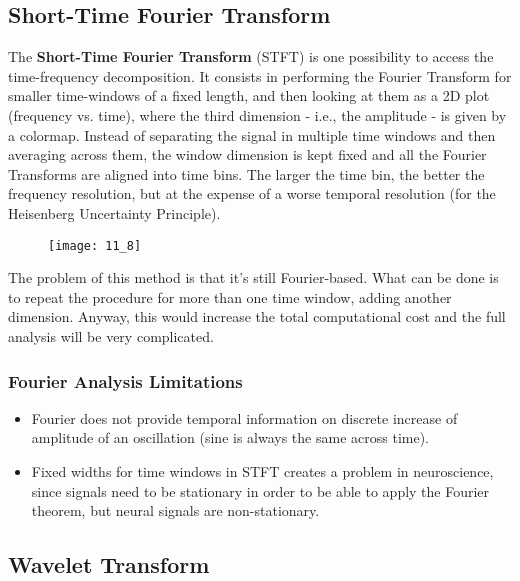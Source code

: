 \subsection{Short-Time Fourier Transform}
The \textbf{Short-Time Fourier Transform} (STFT) is one possibility to access the time-frequency decomposition.
It consists in performing the Fourier Transform for smaller time-windows of a fixed length, and then looking
at them as a 2D plot (frequency vs. time), where the third dimension - i.e., the amplitude - is given by a
colormap. Instead of separating the signal in multiple time windows and then averaging across them, the window
dimension is kept fixed and all the Fourier Transforms are aligned into time bins. The larger the time bin,
the better the frequency resolution, but at the expense of a worse temporal resolution (for the
Heisenberg Uncertainty Principle).
\begin{figure}[H]
    \texttt{[image: 11\_8]}
    \centering
\end{figure}
The problem of this method is that it's still Fourier-based. What can be done is to repeat the procedure for
more than one time window, adding another dimension. Anyway, this would increase the total computational cost
and the full analysis will be very complicated.
\subsubsection{Fourier Analysis Limitations}
\begin{itemize}
    \item Fourier does not provide temporal information on discrete increase of amplitude of an oscillation
          (sine is always the same across time).
    \item Fixed widths for time windows in STFT creates a problem in neuroscience, since signals need to be
          stationary in order to be able to apply the Fourier theorem, but neural signals are non-stationary.
\end{itemize}

\subsection{Wavelet Transform}
